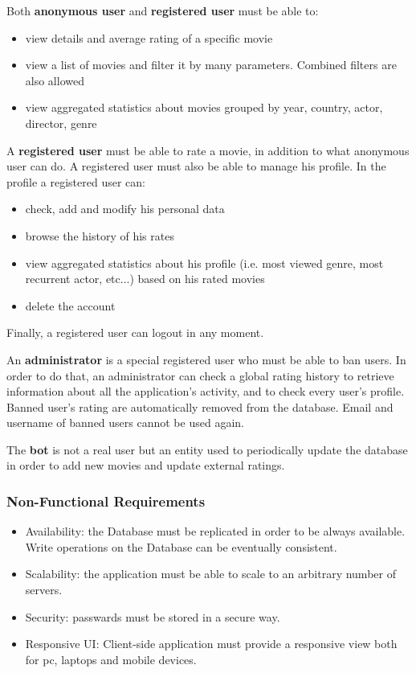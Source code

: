 \documentclass[11pt]{article}
\begin{document}
Both \textbf{anonymous user} and \textbf{registered user} must be able to:
\begin{itemize}
	\item view details and average rating of a specific movie
	\item view a list of movies and filter it by many parameters. Combined filters 
	are also allowed
	\item view aggregated statistics about movies grouped by year, country, actor,
	director, genre 
\end{itemize}

A \textbf{registered user} must be able to rate a movie, in addition to what anonymous
user can do. A registered user must also be able to manage his profile. In the profile a
registered user can:
\begin{itemize}
	\item check, add and modify his personal data
	\item browse the history of his rates
	\item view aggregated statistics about his profile (i.e. most viewed genre,
	most recurrent actor, etc...) based on his rated movies
	\item delete the account
\end{itemize}
Finally, a registered user can logout in any moment.

An \textbf{administrator} is a special registered user who must be able to ban users.
In order to do that, an administrator can check a global rating history to retrieve information
about all the application's activity, and to check every user's profile.
Banned user's rating are automatically removed from the database. Email and username
of banned users cannot be used again.

The \textbf{bot} is not a real user but an entity used to periodically update the database in order to add new movies and update external ratings. 

\subsubsection{Non-Functional Requirements}
\begin{itemize}
	\item Availability: the Database must be replicated in order to be always available.
	Write operations on the Database can be eventually consistent.
	\item Scalability: the application must be able to scale to an arbitrary number of servers.
	\item Security: passwards must be stored in a secure way.
	\item Responsive UI: Client-side application must provide a responsive view both for pc, 
	laptops and mobile devices.
\end{itemize}
\end{document}
